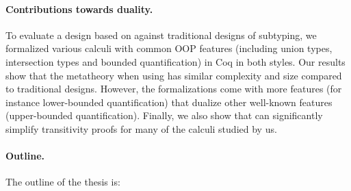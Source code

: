 \paragraph{Contributions towards duality.}
To evaluate a design based on \nameduo against traditional designs of subtyping,
we formalized various calculi with common OOP features (including union types,
intersection types and bounded quantification) in Coq in both styles.
Our results show that the metatheory when using \nameduo has similar
complexity and size compared to traditional designs. However, the \nameduo
formalizations come with more features (for instance
lower-bounded quantification) that dualize other well-known features
(upper-bounded quantification). Finally, we also show that \nameduo can
significantly simplify transitivity proofs for many of the calculi studied
by us.

\paragraph{Outline.}
The outline of the thesis is:

